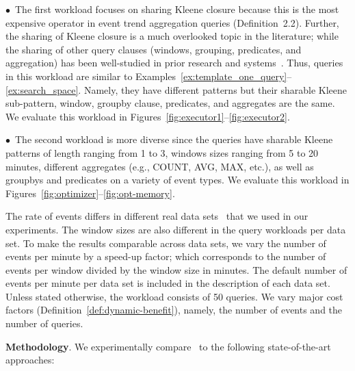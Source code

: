 $\bullet$~The first workload focuses on sharing Kleene closure because this is the most expensive operator in event trend aggregation queries (Definition~2.2). 
Further, the sharing of Kleene closure is a much overlooked topic in the literature; while the sharing of other query clauses (windows, grouping, predicates, and aggregation) has been well-studied in prior research and systems~\cite{AW04, GSCL12, KWF06, LMTPT05, LRGGWAM11}. Thus, queries in this workload are similar to Examples~\ref{ex:template_one_query}--\ref{ex:search_space}. Namely, they have different patterns but their sharable Kleene sub-pattern, window, groupby clause, predicates, and aggregates are the same. We evaluate this workload in Figures~\ref{fig:executor1}--\ref{fig:executor2}.

$\bullet$~The second workload is more diverse since the queries have sharable Kleene patterns of length ranging from 1 to 3, windows sizes ranging from 5 to 20 minutes, different aggregates (e.g., COUNT, AVG, MAX, etc.), as well as groupbys and predicates on a variety of event types. We evaluate this workload in Figures~\ref{fig:optimizer}--\ref{fig:opt-memory}.
%

The rate of events differs in different real data sets~\cite{uber1, smarthome, stockStream} that we used in our experiments. The window sizes are also different in the query workloads per data set. To make the results comparable across data sets, we vary the number of events per minute by a speed-up factor; which corresponds to the number of events per window divided by the window size in minutes.
%
The default number of events per minute per data set is included in the description of each data set.
Unless stated otherwise, 
the workload consists of 50 queries.
We vary  major cost factors (Definition~\ref{def:dynamic-benefit}), namely,
the number of events and
the number of queries.


\textbf{Methodology}. 
%
We experimentally compare \app\ to the following state-of-the-art approaches:


